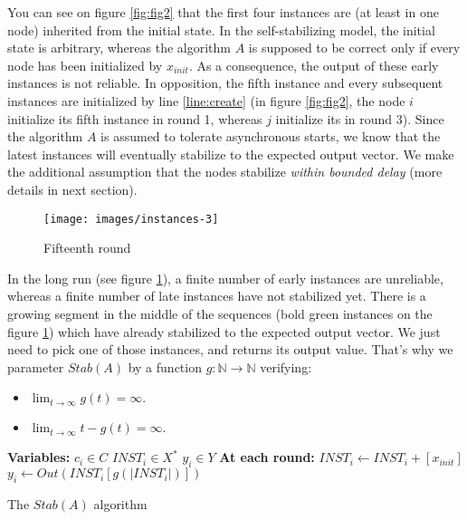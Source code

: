 \documentclass[11pt,letterpaper]{article}
\begin{document}
You can see on figure \ref{fig:fig2} that the first four instances are (at least in one node) inherited from the initial state.
In the self-stabilizing model, the initial state is arbitrary, whereas the algorithm $A$ is supposed to be correct only if every node has been initialized by $x_{init}$.
As a consequence, the output of these early instances is not reliable.
In opposition, the fifth instance and every subsequent instances are initialized by line \ref{line:create}
(in figure \ref{fig:fig2}, the node $i$ initialize its fifth instance in round 1, whereas $j$ initialize its in round 3).
Since the algorithm $A$ is assumed to tolerate asynchronous starts, we know that the latest instances will eventually stabilize to the expected output vector.
We make the additional assumption that the nodes stabilize \textit{within bounded delay} (more details in next section).

\begin{figure}[h!]
	\texttt{[image: images/instances-3]}
	\caption{Fifteenth round}
	\label{fig:fig3}
\end{figure}

In the long run (see figure \ref{fig:fig3}), a finite number of early instances are unreliable, whereas a finite number of late instances have not stabilized yet.
There is a growing segment in the middle of the sequences (bold green instances on the figure \ref{fig:fig3}) which have already stabilized to the expected output vector.
We just need to pick one of those instances, and returns its output value.
That's why we parameter $Stab(A)$ by a function $g : \mathds{N} \rightarrow \mathds{N}$ verifying:

\begin{itemize}
	\item $\lim_{t \rightarrow \infty} g(t) = \infty.$
	\item $\lim_{t \rightarrow \infty} t-g(t) = \infty.$
\end{itemize}

\begin{algorithm}[h!]
	\DontPrintSemicolon
	\textbf{Variables:} \;
	\Indp
		$c_i \in C$  \;
		$INST_i \in X^*$  \;
		$y_i \in Y$  \;
	\BlankLine
	\Indm
	\textbf{At each round:} \;
	\Indp
		$INST_i \leftarrow INST_i + [x_{init}]$  \label{line:create} \;
		$y_i \leftarrow Out(INST_i[g(|INST_i|)])$ \label{line:output} \;
	\Indm
	\caption{The $Stab(A)$ algorithm} 
\end{algorithm}
\end{document}
